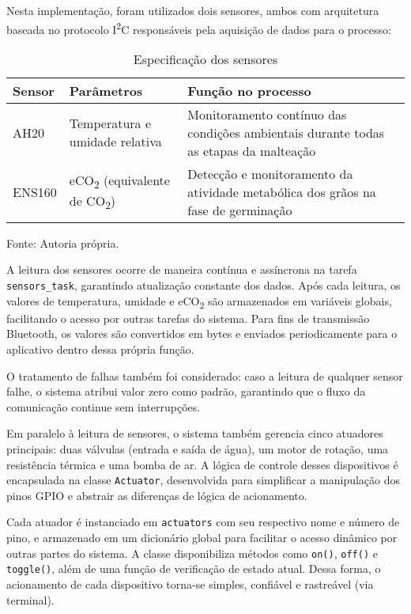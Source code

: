 Nesta implementação, foram utilizados dois sensores, ambos com arquitetura baseada no protocolo I\textsuperscript{2}C responsáveis pela aquisição de dados para o processo:

\begin{table}[H]
    \caption{Especificação dos sensores}
    \label{tab:sensores_atuadores}
    \centering
    \begin{tabular}{llp{8cm}}
        \hline
        \textbf{Sensor} & \textbf{Parâmetros} & \textbf{Função no processo} \\
        \hline
        AH20 & Temperatura e umidade relativa & Monitoramento contínuo das condições ambientais durante todas as etapas da malteação \\
        ENS160 & eCO\textsubscript{2} (equivalente de CO\textsubscript{2}) & Detecção e monitoramento da atividade metabólica dos grãos na fase de germinação \\
        \hline
    \end{tabular}
    
    {\centering\footnotesize Fonte: Autoria própria.\par}
\end{table}

A leitura dos sensores ocorre de maneira contínua e assíncrona na tarefa \texttt{sensors\_task}, garantindo atualização constante dos dados. Após cada leitura, os valores de temperatura, umidade e eCO\textsubscript{2} são armazenados em variáveis globais, facilitando o acesso por outras tarefas do sistema. Para fins de transmissão Bluetooth, os valores são convertidos em bytes e enviados periodicamente para o aplicativo dentro dessa própria função.

O tratamento de falhas também foi considerado: caso a leitura de qualquer sensor falhe, o sistema atribui valor zero como padrão, garantindo que o fluxo da comunicação continue sem interrupções.

Em paralelo à leitura de sensores, o sistema também gerencia cinco atuadores principais: duas válvulas (entrada e saída de água), um motor de rotação, uma resistência térmica e uma bomba de ar. A lógica de controle desses dispositivos é encapsulada na classe \texttt{Actuator}, desenvolvida para simplificar a manipulação dos pinos GPIO e abstrair as diferenças de lógica de acionamento.

Cada atuador é instanciado em \texttt{actuators} com seu respectivo nome e número de pino, e armazenado em um dicionário global para facilitar o acesso dinâmico por outras partes do sistema. A classe disponibiliza métodos como \texttt{on()}, \texttt{off()} e \texttt{toggle()}, além de uma função de verificação de estado atual. Dessa forma, o acionamento de cada dispositivo torna-se simples, confiável e rastreável (via terminal).

